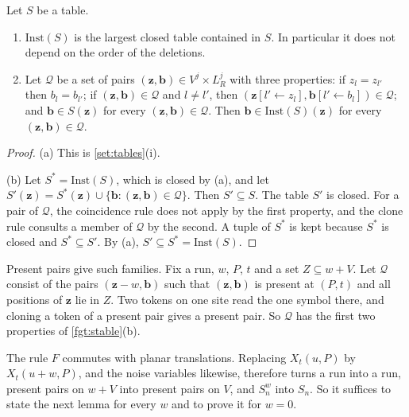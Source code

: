 \begin{lemma}\label{fgt:stable}
Let $S$ be a table.
\begin{enumerate}[label=(\alph*)]
\item $\mathrm{Inst}(S)$ is the largest closed table contained in $S$. In particular it does not depend on the order of the deletions.
\item Let $\mathcal Q$ be a set of pairs $(\mathbf z,\mathbf b)\in V^j\times L_R^j$ with three properties: if $z_l=z_{l'}$ then $b_l=b_{l'}$; if $(\mathbf z,\mathbf b)\in\mathcal Q$ and $l\ne l'$, then $(\mathbf z[l'\leftarrow z_l],\mathbf b[l'\leftarrow b_l])\in\mathcal Q$; and $\mathbf b\in S(\mathbf z)$ for every $(\mathbf z,\mathbf b)\in\mathcal Q$. Then $\mathbf b\in\mathrm{Inst}(S)(\mathbf z)$ for every $(\mathbf z,\mathbf b)\in\mathcal Q$.
\end{enumerate}
\end{lemma}

\begin{proof}
(a) This is \cref{set:tables}(i).

(b) Let $S^*=\mathrm{Inst}(S)$, which is closed by (a), and let $S'(\mathbf z)=S^*(\mathbf z)\cup\{\mathbf b:(\mathbf z,\mathbf b)\in\mathcal Q\}$. Then $S'\subseteq S$. The table $S'$ is closed. For a pair of $\mathcal Q$, the coincidence rule does not apply by the first property, and the clone rule consults a member of $\mathcal Q$ by the second. A tuple of $S^*$ is kept because $S^*$ is closed and $S^*\subseteq S'$. By (a), $S'\subseteq S^*=\mathrm{Inst}(S)$.
\end{proof}

Present pairs give such families. Fix a run, $w$, $P$, $t$ and a set $Z\subseteq w+V$. Let $\mathcal Q$ consist of the pairs $(\mathbf z-w,\mathbf b)$ such that $(\mathbf z,\mathbf b)$ is present at $(P,t)$ and all positions of $\mathbf z$ lie in $Z$. Two tokens on one site read the one symbol there, and cloning a token of a present pair gives a present pair. So $\mathcal Q$ has the first two properties of \cref{fgt:stable}(b).

The rule $F$ commutes with planar translations. Replacing $X_t(u,P)$ by $X_t(u+w,P)$, and the noise variables likewise, therefore turns a run into a run, present pairs on $w+V$ into present pairs on $V$, and $S^w_n$ into $S_n$. So it suffices to state the next lemma for every $w$ and to prove it for $w=0$.

